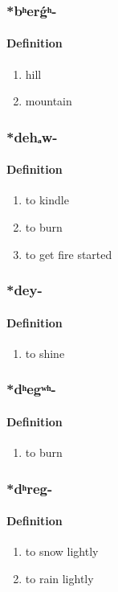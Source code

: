 \subsubsection{\**bʰerǵʰ-}
\paragraph{Definition}
\begin{enumerate}
\item hill
\item mountain
\end{enumerate}
\subsubsection{\**dehₐw-}
\paragraph{Definition}
\begin{enumerate}
\item to kindle
\item to burn
\item to get fire started
\end{enumerate}
\subsubsection{\**dey-}
\paragraph{Definition}
\begin{enumerate}
\item to shine
\end{enumerate}
\subsubsection{\**dʰegʷʰ-}
\paragraph{Definition}
\begin{enumerate}
\item to burn
\end{enumerate}
\subsubsection{\**dʰreg-}
\paragraph{Definition}
\begin{enumerate}
\item to snow lightly
\item to rain lightly
\end{enumerate}
